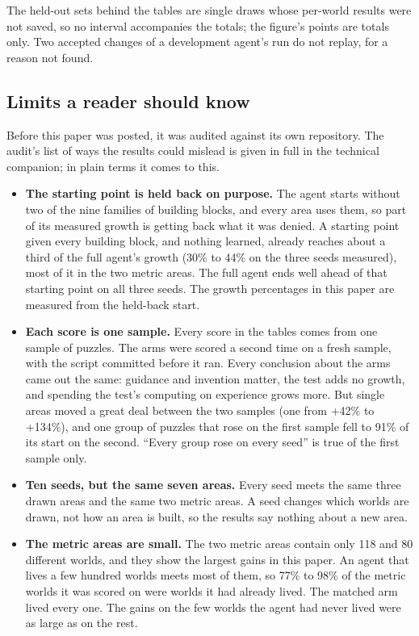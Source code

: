 \documentclass[11pt]{article}
\begin{document}
The held-out sets behind the tables are single draws whose per-world results were not saved, so no interval accompanies the totals; the figure's points are totals only. Two accepted changes of a development agent's run do not replay, for a reason not found.

\subsection{Limits a reader should know}
\label{sec:limits}

Before this paper was posted, it was audited against its own repository. The audit's list of ways the results could mislead is given in full in the technical companion; in plain terms it comes to this.

\begin{itemize}[leftmargin=*]
\item \textbf{The starting point is held back on purpose.} The agent starts without two of the nine families of building blocks, and every area uses them, so part of its measured growth is getting back what it was denied. A starting point given every building block, and nothing learned, already reaches about a third of the full agent's growth (30\% to 44\% on the three seeds measured), most of it in the two metric areas. The full agent ends well ahead of that starting point on all three seeds. The growth percentages in this paper are measured from the held-back start.
\item \textbf{Each score is one sample.} Every score in the tables comes from one sample of puzzles. The arms were scored a second time on a fresh sample, with the script committed before it ran. Every conclusion about the arms came out the same: guidance and invention matter, the test adds no growth, and spending the test's computing on experience grows more. But single areas moved a great deal between the two samples (one from +42\% to +134\%), and one group of puzzles that rose on the first sample fell to 91\% of its start on the second. ``Every group rose on every seed'' is true of the first sample only.
\item \textbf{Ten seeds, but the same seven areas.} Every seed meets the same three drawn areas and the same two metric areas. A seed changes which worlds are drawn, not how an area is built, so the results say nothing about a new area.
\item \textbf{The metric areas are small.} The two metric areas contain only 118 and 80 different worlds, and they show the largest gains in this paper. An agent that lives a few hundred worlds meets most of them, so 77\% to 98\% of the metric worlds it was scored on were worlds it had already lived. The matched arm lived every one. The gains on the few worlds the agent had never lived were as large as on the rest.

\end{itemize}
\end{document}
